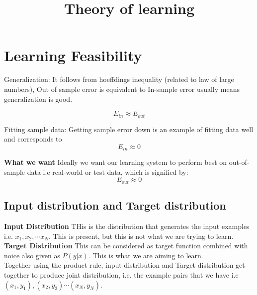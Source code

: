 \documentclass[10pt,a4paper]{article}
\begin{document}
\title{Theory of learning}
\maketitle



\section{Learning Feasibility}

	Generalization: It follows from hoeffdings inequality (related to law of large numbers), Out of sample error is equivalent to In-sample error usually means generalization is good.  
	
	\begin{equation}
		E_{in} \approx E_{out}
	\end{equation}

	
	Fitting sample data: Getting sample error down is an example of fitting data well and corresponds to 
		\begin{equation}
			E_{in} \approx 0
		\end{equation}

	\textbf{What we want} Ideally we want our learning system to perform best on out-of-sample data i.e real-world or test data,
	which is signified by:
	\begin{equation}
		E_{out} \approx 0
	\end{equation}

	\subsection{Input distribution and Target distribution}
	 \textbf{Input Distribution} THis is the distribution that generates the input examples i.e. $x_1, x_2, \cdots x_N $. This is present, but this is not what we are trying to learn. \\
	
	\textbf{Target Distribution} This can be considered as target function combined with noice also given as $P(y|x)$. This is what we are aiming to learn.\\
	
	Together using the product rule, input distribution and Target distribution get together to produce joint distribution, i.e. the example pairs that we have i.e $(x_1, y_1), (x_2, y_2) \cdots (x_N, y_N) $.
	
	
\end{document}
